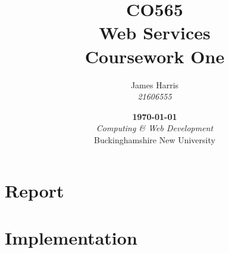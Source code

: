 \documentclass{report}
\title{
    \Large CO565\\
    Web Services\vspace*{.65cm}\\
    \huge Coursework One\vfill
}
\author{
    James Harris\\
    \textit{21606555}
}
\date{
    \vfill\textbf\today\\
    \vspace*{.75cm}\textit{Computing \& Web Development}\\
    Buckinghamshire New University
}
\begin{document}
    \maketitle
    \tableofcontents

    \part{Report}
    
    
    
    

    \part{Implementation}
    
    
    
    
\end{document}
